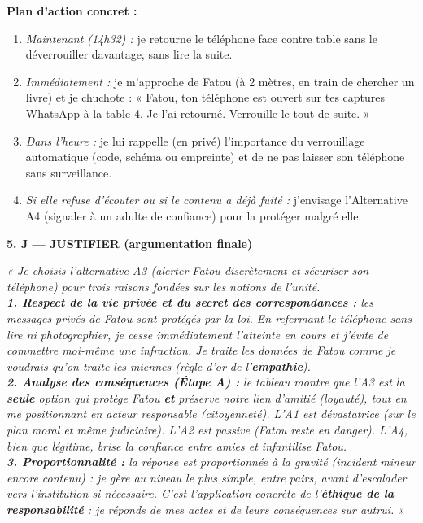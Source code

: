 \documentclass[11pt]{article}
\begin{document}
\begin{experience}
\textbf{Plan d'action concret :}
\begin{enumerate}
    \item \textit{Maintenant (14h32) :} je retourne le téléphone face contre table sans le déverrouiller davantage, sans lire la suite.
    \item \textit{Immédiatement :} je m'approche de Fatou (à 2 mètres, en train de chercher un livre) et je chuchote : « Fatou, ton téléphone est ouvert sur tes captures WhatsApp à la table 4. Je l'ai retourné. Verrouille-le tout de suite. »
    \item \textit{Dans l'heure :} je lui rappelle (en privé) l'importance du verrouillage automatique (code, schéma ou empreinte) et de ne pas laisser son téléphone sans surveillance.
    \item \textit{Si elle refuse d'écouter ou si le contenu a déjà fuité :} j'envisage l'Alternative A4 (signaler à un adulte de confiance) pour la protéger malgré elle.
\end{enumerate}

\noindent\textbf{5. J — JUSTIFIER (argumentation finale)}

\textit{« Je choisis l'alternative A3 (alerter Fatou discrètement et sécuriser son téléphone) pour trois raisons fondées sur les notions de l'unité. \\
\textbf{1. Respect de la vie privée et du secret des correspondances :} les messages privés de Fatou sont protégés par la loi. En refermant le téléphone sans lire ni photographier, je cesse immédiatement l'atteinte en cours et j'évite de commettre moi-même une infraction. Je traite les données de Fatou comme je voudrais qu'on traite les miennes (règle d'or de l'\textbf{empathie}). \\
\textbf{2. Analyse des conséquences (Étape A) :} le tableau montre que l'A3 est la \textbf{seule} option qui protège Fatou \textbf{et} préserve notre lien d'amitié (loyauté), tout en me positionnant en acteur responsable (citoyenneté). L'A1 est dévastatrice (sur le plan moral et même judiciaire). L'A2 est passive (Fatou reste en danger). L'A4, bien que légitime, brise la confiance entre amies et infantilise Fatou. \\
\textbf{3. Proportionnalité :} la réponse est proportionnée à la gravité (incident mineur encore contenu) : je gère au niveau le plus simple, entre pairs, avant d'escalader vers l'institution si nécessaire. C'est l'application concrète de l'\textbf{éthique de la responsabilité} : je réponds de mes actes et de leurs conséquences sur autrui. »}
\end{experience}
\end{document}
